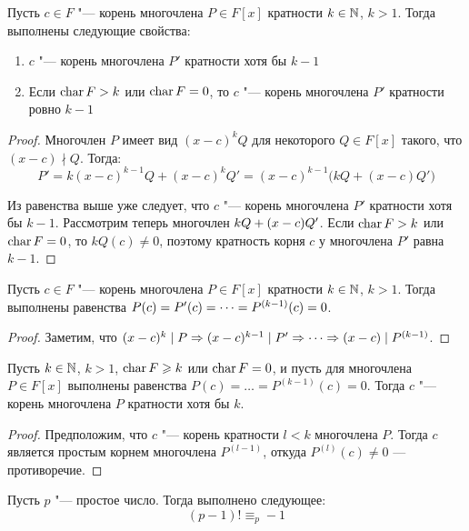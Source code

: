 \begin{theorem}
	Пусть $c \in F$ "--- корень многочлена $P \in F[x]$ кратности $k \in \mathbb{N}$, $k > 1$. Тогда выполнены следующие свойства:
	\begin{enumerate}
		\item $c$ "--- корень многочлена $P'$ кратности хотя бы $k - 1$
		\item Если $\operatorname{char}{F} > k$ или $\operatorname{char}{F} = 0$, то $c$ "--- корень многочлена $P'$ кратности ровно $k - 1$
	\end{enumerate}
\end{theorem}

\begin{proof}
	Многочлен $P$ имеет вид $(x - c)^kQ$ для некоторого $Q \in F[x]$ такого, что $(x - c)\nmid Q$. Тогда:
	\[P' = k(x - c)^{k - 1}Q + (x - c)^kQ' = (x - c)^{k - 1}\big(kQ + (x-c)Q'\big)\]
	
	Из равенства выше уже следует, что $c$ "--- корень многочлена $P'$ кратности хотя бы $k - 1$. Рассмотрим теперь многочлен $kQ \hm{+} (x - c)Q'$. Если $\operatorname{char}{F} > k$ или $\operatorname{char}{F} = 0$, то $kQ(c) \ne 0$, поэтому кратность корня $c$ у многочлена $P'$ равна $k - 1$.
\end{proof}

\begin{corollary}
	Пусть $c \in F$ "--- корень многочлена $P \in F[x]$ кратности $k \in \mathbb{N}$, $k > 1$. Тогда выполнены равенства $P(c) = P'(c) \hm{=} \dots = P^{(k - 1)}(c) = 0$.
\end{corollary}

\begin{proof}
	Заметим, что $(x - c)^k\mid P \Rightarrow (x - c)^{k - 1}\mid P' \hm\Rightarrow \dots \Rightarrow (x - c)\mid P^{(k - 1)}$.
\end{proof}

\begin{corollary}
	Пусть $k \in \mathbb{N}$, $k > 1$, $\operatorname{char}{F} \geqslant k$ или $\operatorname{char}{F} = 0$, и пусть для многочлена $P \in F[x]$ выполнены равенства $P(c) = \dots = P^{(k - 1)}(c) = 0$. Тогда $c$ "--- корень многочлена $P$ кратности хотя бы $k$.
\end{corollary}

\begin{proof}
	Предположим, что $c$ "--- корень кратности $l < k$ многочлена $P$. Тогда $c$ является простым корнем многочлена $P^{(l - 1)}$, откуда $P^{(l)}(c) \ne 0$ --- противоречие.
\end{proof}

\begin{corollary}
	Пусть $p$ "--- простое число. Тогда выполнено следующее:
	\[(p - 1)! \equiv_p -1\]
\end{corollary}

